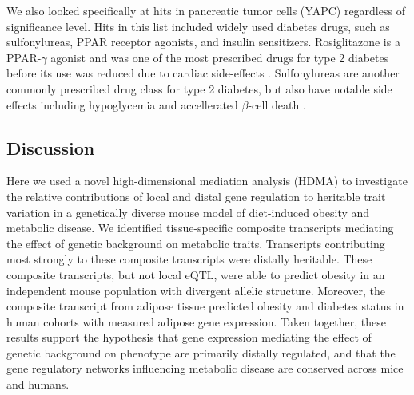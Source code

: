 \documentclass[
]{article}
\begin{document}
We also looked specifically at hits in pancreatic tumor cells (YAPC)
regardless of significance level. Hits in this list included widely used
diabetes drugs, such as sulfonylureas, PPAR receptor agonists, and
insulin sensitizers. Rosiglitazone is a PPAR-\(\gamma\) agonist and was
one of the most prescribed drugs for type 2 diabetes before its use was
reduced due to cardiac side-effects \cite{pmid21190462}. Sulfonylureas
are another commonly prescribed drug class for type 2 diabetes, but also
have notable side effects including hypoglycemia and accellerated
\(\beta\)-cell death \cite{pmid16631807}.

\subsection{Discussion}\label{discussion}

Here we used a novel high-dimensional mediation analysis (HDMA) to
investigate the relative contributions of local and distal gene
regulation to heritable trait variation in a genetically diverse mouse
model of diet-induced obesity and metabolic disease. We identified
tissue-specific composite transcripts mediating the effect of genetic
background on metabolic traits. Transcripts contributing most strongly
to these composite transcripts were distally heritable. These composite
transcripts, but not local eQTL, were able to predict obesity in an
independent mouse population with divergent allelic structure. Moreover,
the composite transcript from adipose tissue predicted obesity and
diabetes status in human cohorts with measured adipose gene expression.
Taken together, these results support the hypothesis that gene
expression mediating the effect of genetic background on phenotype are
primarily distally regulated, and that the gene regulatory networks
influencing metabolic disease are conserved across mice and humans.
\end{document}
